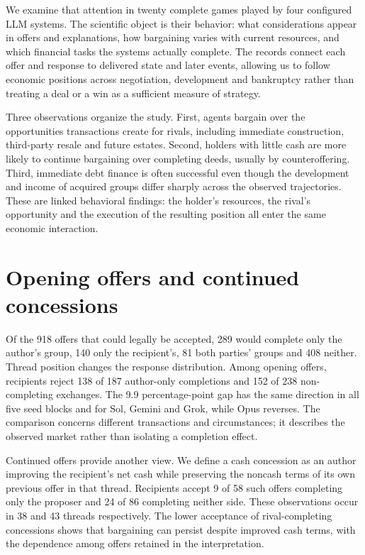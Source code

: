 We examine that attention in twenty complete games played by four configured
LLM systems. The scientific object is their behavior: what considerations
appear in offers and explanations, how bargaining varies with current
resources, and which financial tasks the systems actually complete. The
records connect each offer and response to delivered state and later events,
allowing us to follow economic positions across negotiation, development and
bankruptcy rather than treating a deal or a win as a sufficient measure of
strategy.

Three observations organize the study. First, agents bargain over the
opportunities transactions create for rivals, including immediate construction,
third-party resale and future estates. Second, holders with little cash are
more likely to continue bargaining over completing deeds, usually by
counteroffering. Third, immediate debt finance is often successful even though
the development and income of acquired groups differ sharply across the
observed trajectories. These are linked behavioral findings: the holder's
resources, the rival's opportunity and the execution of the resulting position
all enter the same economic interaction.

\section*{Opening offers and continued concessions}

Of the 918 offers that could legally be accepted, 289 would complete only the
author's group, 140 only the recipient's, 81 both parties' groups and 408
neither. Thread position changes the response distribution. Among opening
offers, recipients reject 138 of 187 author-only completions and 152 of 238
non-completing exchanges. The 9.9 percentage-point gap has the same direction
in all five seed blocks and for Sol, Gemini and Grok, while Opus reverses.
The comparison concerns different transactions and circumstances; it describes
the observed market rather than isolating a completion effect.

Continued offers provide another view. We define a cash concession as an
author improving the recipient's net cash while preserving the noncash terms
of its own previous offer in that thread. Recipients accept 9 of 58 such
offers completing only the proposer and 24 of 86 completing neither side.
These observations occur in 38 and 43 threads respectively. The lower
acceptance of rival-completing concessions shows that bargaining can persist
despite improved cash terms, with the dependence among offers retained in
the interpretation.

